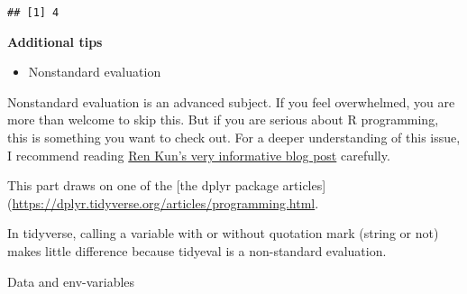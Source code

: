 \documentclass[
]{book}
\newenvironment{Shaded}{\begin{snugshade}}{\end{snugshade}}
\newcommand{\CommentTok}[1]{\textcolor[rgb]{0.56,0.35,0.01}{\textit{#1}}}
\newcommand{\DataTypeTok}[1]{\textcolor[rgb]{0.13,0.29,0.53}{#1}}
\newcommand{\DecValTok}[1]{\textcolor[rgb]{0.00,0.00,0.81}{#1}}
\newcommand{\KeywordTok}[1]{\textcolor[rgb]{0.13,0.29,0.53}{\textbf{#1}}}
\newcommand{\NormalTok}[1]{#1}
\newcommand{\OperatorTok}[1]{\textcolor[rgb]{0.81,0.36,0.00}{\textbf{#1}}}
\newcommand{\StringTok}[1]{\textcolor[rgb]{0.31,0.60,0.02}{#1}}
\providecommand{\tightlist}{%
  \setlength{\itemsep}{0pt}\setlength{\parskip}{0pt}}
\begin{document}
\begin{verbatim}
## [1] 4
\end{verbatim}

\textbf{Additional tips}

\begin{itemize}
\tightlist
\item
  Nonstandard evaluation
\end{itemize}

Nonstandard evaluation is an advanced subject. If you feel overwhelmed, you are more than welcome to skip this. But if you are serious about R programming, this is something you want to check out. For a deeper understanding of this issue, I recommend reading \href{https://renkun.me/2014/12/03/tips-on-non-standard-evaluation-in-r/}{Ren Kun's very informative blog post} carefully.

This part draws on one of the {[}the dplyr package articles{]}(\url{https://dplyr.tidyverse.org/articles/programming.html}.

In tidyverse, calling a variable with or without quotation mark (string or not) makes little difference because tidyeval is a non-standard evaluation.

\begin{Shaded}
\end{Shaded}

Data and env-variables

\begin{Shaded}
\end{Shaded}
\end{document}

